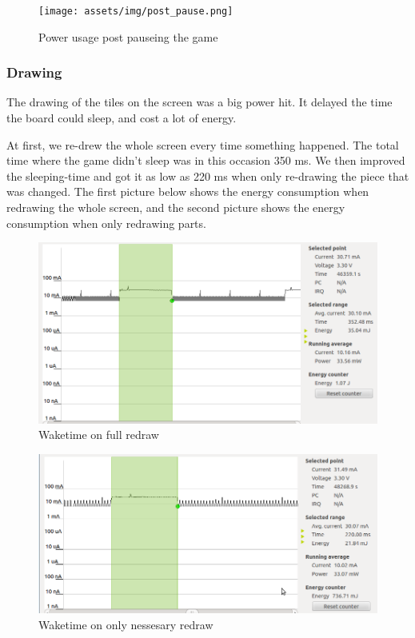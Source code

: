 \begin{figure}[ht!]
    \begin{center}
    \texttt{[image: assets/img/post\_pause.png]}
    \caption{Power usage post pauseing the game}
    \label{fig:idle}
    \end{center}
\end{figure}

\subsubsection{Drawing}
The drawing of the tiles on the screen was a big power hit.
It delayed the time the board could sleep, and cost a lot of energy.

At first, we re-drew the whole screen every time something happened.
The total time where the game didn't sleep was in this occasion 350 ms.
We then improved the sleeping-time and got it as low as 220 ms when only re-drawing the piece that was changed.
The first picture below shows the energy consumption when redrawing the whole screen, and the second picture shows the energy consumption when only redrawing parts.

\begin{figure}[ht!]
    \begin{center}
    \includegraphics[width=1\textwidth]{assets/img/waketime_full-redraw}
    \caption{Waketime on full redraw}
    \label{fig:idle}
    \end{center}
\end{figure}

\begin{figure}[ht!]
    \begin{center}
    \includegraphics[width=1\textwidth]{assets/img/waketime_delta-redraw}
    \caption{Waketime on only nessesary redraw}
    \label{fig:idle}
    \end{center}
\end{figure}
